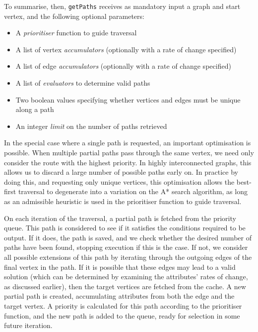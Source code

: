 To summarise, then, \texttt{getPaths} receives as mandatory input a graph and
start vertex, and the following optional parameters:

\begin{itemize}
    \item A \textit{prioritiser} function to guide traversal
    \item A list of vertex \textit{accumulators} (optionally with a rate of change specified)
    \item A list of edge \textit{accumulators} (optionally with a rate of change specified)
    \item A list of \textit{evaluators} to determine valid paths
    \item Two boolean values specifying whether vertices and edges must be unique along a path
    \item An integer \textit{limit} on the number of paths retrieved
\end{itemize}


In the special case where a single path is requested, an important
optimisation is possible. When multiple partial paths pass through the same
vertex, we need only consider the route with the highest priority. In highly
interconnected graphs, this allows us to discard a large number of possible
paths early on. In practice by doing this, and requesting only unique
vertices, this  optimisation allows the best-first traversal to degenerate
into a variation on the A* search algorithm, as long as an admissible
heuristic is used in the prioritiser function to guide traversal.

On each iteration of the traversal, a partial path is fetched from the
priority queue. This path is considered to see if it satisfies the conditions
required to be output. If it does, the path is saved, and we check whether the
desired number of paths have been found, stopping execution if this is the
case. If not, we consider all possible extensions of this path by iterating
through the outgoing edges of the final vertex in the path. If it is possible
that these edges may lead to a valid solution (which can be determined by
examining the attributes' rates of change, as discussed earlier), then the
target vertices are fetched from the cache. A new partial path is created,
accumulating attributes from both the edge and the target vertex. A priority
is calculated for this path according to the prioritiser function,  and the
new path is added to the queue, ready for selection in some future iteration.

